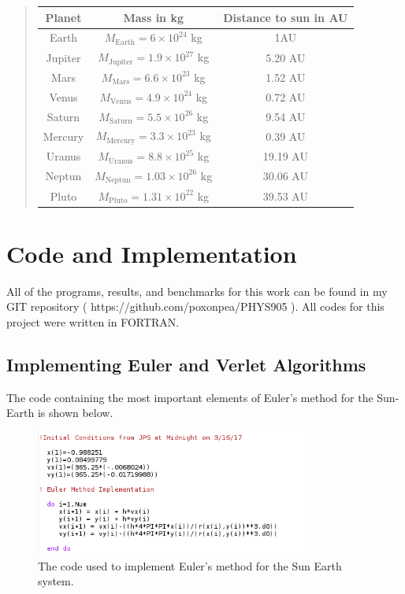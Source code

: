 \documentclass[%
oneside,                 %
final,                   %
10pt]{article}
\begin{document}
\begin{quote}
\begin{tabular}{ccc}
\hline
\multicolumn{1}{c}{ Planet } & \multicolumn{1}{c}{ Mass in kg } & \multicolumn{1}{c}{ Distance to  sun in AU } \\
\hline
Earth   & $M_{\mathrm{Earth}}=6\times 10^{24}$ kg     & 1AU                    \\
Jupiter & $M_{\mathrm{Jupiter}}=1.9\times 10^{27}$ kg & 5.20 AU                \\
Mars    & $M_{\mathrm{Mars}}=6.6\times 10^{23}$ kg    & 1.52 AU                \\
Venus   & $M_{\mathrm{Venus}}=4.9\times 10^{24}$ kg   & 0.72 AU                \\
Saturn  & $M_{\mathrm{Saturn}}=5.5\times 10^{26}$ kg  & 9.54 AU                \\
Mercury & $M_{\mathrm{Mercury}}=3.3\times 10^{23}$ kg & 0.39 AU                \\
Uranus  & $M_{\mathrm{Uranus}}=8.8\times 10^{25}$ kg  & 19.19 AU               \\
Neptun  & $M_{\mathrm{Neptun}}=1.03\times 10^{26}$ kg & 30.06 AU               \\
Pluto   & $M_{\mathrm{Pluto}}=1.31\times 10^{22}$ kg  & 39.53 AU               \\
\hline
\end{tabular}
\end{quote}

\section{Code and Implementation}

All of the programs, results, and benchmarks for this work can be found in my GIT repository ( https://github.com/poxonpea/PHYS905 ).  All codes for this project were written in FORTRAN.

\subsection{Implementing Euler and Verlet Algorithms}

The code containing the most important elements of Euler's method for the Sun-Earth is shown below.

\begin{figure}[H]\label{fig:eulercode}
  \centering
    \includegraphics[width=0.8\textwidth]{EulerCode.png}
    \caption{The code used to implement Euler's method for the Sun Earth system.}
\end{figure}
\end{document}
